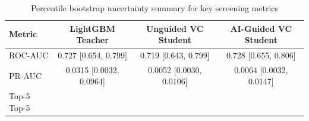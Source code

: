\begin{table}[!ht]
\centering
\caption{Percentile bootstrap uncertainty summary for key screening metrics}
\label{tab:bootstrap}
\begin{tabular}{lccc}
\toprule
\textbf{Metric} & \textbf{LightGBM Teacher} & \textbf{Unguided VC Student} & \textbf{AI-Guided VC Student} \\
\midrule
ROC-AUC & 0.727 [0.654, 0.799] & 0.719 [0.643, 0.799] & 0.728 [0.655, 0.806] \\
PR-AUC & 0.0315 [0.0032, 0.0964] & 0.0052 [0.0030, 0.0106] & 0.0064 [0.0032, 0.0147] \\
Top-5%
Top-5%
\bottomrule
\end{tabular}
\end{table}